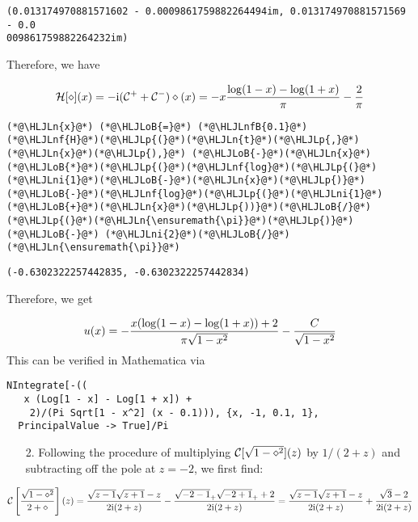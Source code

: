 \documentclass[12pt,landscape]{article}
\newcommand{\HLJLn}[1]{#1}
\newcommand{\HLJLnf}[1]{\textcolor[RGB]{66,102,213}{#1}}
\newcommand{\HLJLnfB}[1]{\textcolor[RGB]{59,151,46}{#1}}
\newcommand{\HLJLni}[1]{\textcolor[RGB]{59,151,46}{#1}}
\newcommand{\HLJLoB}[1]{\textcolor[RGB]{102,102,102}{\textbf{#1}}}
\newcommand{\HLJLp}[1]{#1}
\def\I{ {\rm i} }
\def\CC{ {\cal C} }
\def\HH{ {\cal H} }
\begin{document}
{\begin{lstlisting}
(0.013174970881571602 - 0.0009861759882264494im, 0.013174970881571569 - 0.0
009861759882264232im)
\end{lstlisting}


Therefore, we have

\[
\HH[\diamond](x) = -\I (\CC^+ + \CC^-) \diamond(x) = -x {\log(1-x) - \log(1+x) \over \pi} -{2 \over \pi}
\]

\begin{lstlisting}
(*@\HLJLn{x}@*) (*@\HLJLoB{=}@*) (*@\HLJLnfB{0.1}@*)
(*@\HLJLnf{H}@*)(*@\HLJLp{(}@*)(*@\HLJLn{t}@*)(*@\HLJLp{,}@*)(*@\HLJLn{x}@*)(*@\HLJLp{),}@*) (*@\HLJLoB{-}@*)(*@\HLJLn{x}@*)(*@\HLJLoB{*}@*)(*@\HLJLp{(}@*)(*@\HLJLnf{log}@*)(*@\HLJLp{(}@*)(*@\HLJLni{1}@*)(*@\HLJLoB{-}@*)(*@\HLJLn{x}@*)(*@\HLJLp{)}@*)(*@\HLJLoB{-}@*)(*@\HLJLnf{log}@*)(*@\HLJLp{(}@*)(*@\HLJLni{1}@*)(*@\HLJLoB{+}@*)(*@\HLJLn{x}@*)(*@\HLJLp{))}@*)(*@\HLJLoB{/}@*)(*@\HLJLp{(}@*)(*@\HLJLn{\ensuremath{\pi}}@*)(*@\HLJLp{)}@*) (*@\HLJLoB{-}@*) (*@\HLJLni{2}@*)(*@\HLJLoB{/}@*)(*@\HLJLn{\ensuremath{\pi}}@*)
\end{lstlisting}

\begin{lstlisting}
(-0.6302322257442835, -0.6302322257442834)
\end{lstlisting}


Therefore, we get

\[
u(x) = - {x(\log(1-x) - \log(1+x))+2 \over  \pi\sqrt{1-x^2}} - {C \over \sqrt{1-x^2}}
\]
This can be verified in Mathematica via

\begin{verbatim}
NIntegrate[-((
   x (Log[1 - x] - Log[1 + x]) +
    2)/(Pi Sqrt[1 - x^2] (x - 0.1))), {x, -1, 0.1, 1},
  PrincipalValue -> True]/Pi
\end{verbatim}
\begin{itemize}
\item[2. ] Following the procedure of multiplying $\CC[\sqrt{1-\diamond^2}](z)$ by $1/(2+z)$ and subtracting off the pole at $z=-2$, we first find:

\end{itemize}
\[
\CC\left[{\sqrt{1-\diamond^2} \over 2+\diamond}\right](z) = {\sqrt{z-1}\sqrt{z+1} - z \over 2\I(2+z)} -{\sqrt{-2-1}_+ \sqrt{-2+1}_+ +2 \over 2\I(2+z)} = {\sqrt{z-1}\sqrt{z+1} - z \over 2\I(2+z)} +{ \sqrt{3} -2 \over 2\I(2+z)}
\]

}
\end{document}
